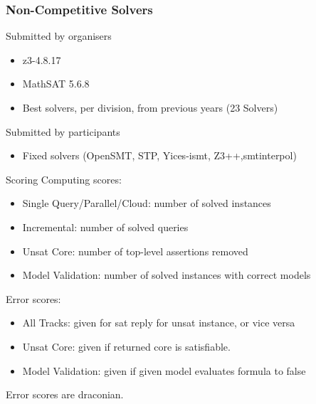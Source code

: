 \documentclass[table]{beamer}
\def\emph#1{\textcolor{MYblue}{#1}}
\begin{document}
\begin{frame}
  \frametitle{Non-Competitive Solvers}

  Submitted by organisers
  \begin{itemize}
  \item z3-4.8.17
  \item MathSAT 5.6.8
  \item Best solvers, per division, from previous years (23 Solvers)
  \end{itemize}
  \bigskip

  Submitted by participants
  \begin{itemize}
  \item Fixed solvers (OpenSMT, STP, Yices-ismt, Z3++,smtinterpol)
  \end{itemize}
\end{frame}

\begin{frame}{Scoring}
  Computing scores:
  \begin{itemize}
  \item \emph{Single Query/Parallel/Cloud}: number of solved \emph{instances}
  \item \emph{Incremental}: number of solved \emph{queries}
  \item \emph{Unsat Core}: number of top-level assertions \emph{removed}
  \item \emph{Model Validation}: number of solved instances with correct \emph{models}
  \end{itemize}

  \bigskip
  Error scores:
  \begin{itemize}
  \item \emph{All Tracks}: given for sat reply for unsat instance, or vice versa
  \item \emph{Unsat Core}: given if returned core is satisfiable.
  \item \emph{Model Validation}: given if given model evaluates formula to \emph{false}
  \end{itemize}
  Error scores are draconian.
\end{frame}
\end{document}
